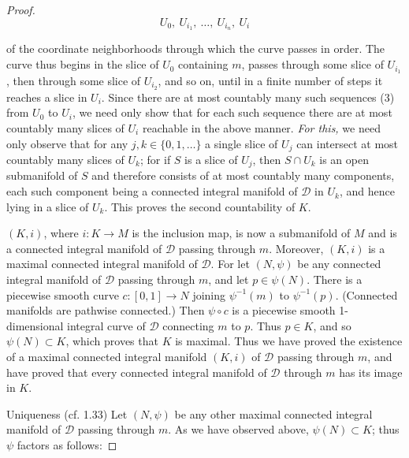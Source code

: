 \begin{proof}
	\begin{equation}
		\tag{3}\label{eq:1.64:3}
		U_{0},~U_{i_{1}},~\ldots,~U_{i_{n}},~U_{i}
	\end{equation}

	of the coordinate neighborhoods through which the curve passes in order. The curve thus begins in the slice of $U_{0}$ containing $m$, passes through some slice of $U_{i_{1}}$, then through some slice of $U_{i_{2}}$, and so on, until in a finite number of steps it reaches a slice in $U_{i}$. Since there are at most countably many such sequences (3) from $U_{0}$ to $U_{i}$, we need only show that for each such sequence there are at most countably many slices of $U_{i}$ reachable in the above manner. \emph{For this,} we need only observe that for any $j, k \in \{0, 1, \ldots\}$ a single slice of $U_{j}$ can intersect at most countably many slices of $U_{k}$; for if $S$ is a slice of $U_{j}$, then $S \cap U_{k}$ is an open submanifold of $S$ and therefore consists of at most countably many components, each such component being a connected integral manifold of $\mathcal{D}$ in $U_{k}$, and hence lying in a slice of $U_{k}$. This proves the second countability of $K$.

	$ (K,i) $, where  $ i: K \to M $ is the inclusion map, is now a submanifold of  $ M $ and is a connected integral manifold of  $ \mathcal{D} $ passing through  $ m $. Moreover,  $ (K,i) $ is a maximal connected integral manifold of  $ \mathcal{D} $. For let  $ (N,\psi) $ be any connected integral manifold of  $ \mathcal{D} $ passing through  $ m $, and let  $ p \in \psi(N) $. There is a piecewise smooth curve  $ c: [0,1] \to N $ joining  $ \psi^{-1}(m) $ to  $ \psi^{-1}(p) $. (Connected manifolds are pathwise connected.) Then  $ \psi \circ c $ is a piecewise smooth 1-dimensional integral curve of  $ \mathcal{D} $ connecting  $ m $ to  $ p $. Thus  $ p \in K $, and so  $ \psi(N) \subset K $, which proves that  $ K $ is maximal. Thus we have proved the existence of a maximal connected integral manifold  $ (K,i) $ of  $ \mathcal{D} $ passing through  $ m $, and have proved that every connected integral manifold of  $ \mathcal{D} $ through  $ m $ has its image in  $ K $.

	\begin{center}
	\end{center}

	Uniqueness (cf. 1.33) Let $(N,\psi)$ be any other maximal connected integral manifold of $\mathcal{D}$ passing through $m$. As we have observed above, $\psi(N) \subset K$; thus $\psi$ factors as follows:


\end{proof}
